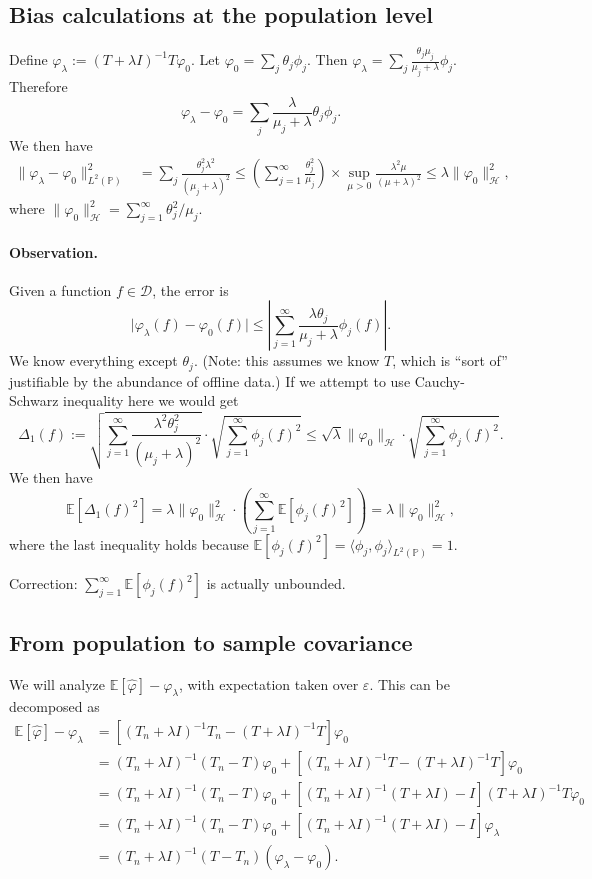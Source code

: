 \documentclass[11pt,a4paper]{article}
\renewcommand{\hat}{\widehat}
\theoremstyle{definition}
\theoremstyle{plain}
\theoremstyle{remark}
\newcommand{\mD}{\mathcal D}
\newcommand{\bP}{\mathbb P}
\newcommand{\lp}{L^2(\bP)}
\newcommand{\mH}{\mathcal H}
\begin{document}
\subsection{Bias calculations at the population level}
Define $\varphi_\lambda := (T+\lambda I)^{-1}T \varphi_0$. Let $\varphi_0 = \sum_j \theta_j \phi_j$. Then $\varphi_\lambda = \sum_j \frac{\theta_j\mu_j}{\mu_j+\lambda}\phi_j$. Therefore
$$
\varphi_\lambda-\varphi_0 = \sum_j \frac{\lambda}{\mu_j+\lambda} \theta_j\phi_j.
$$
We then have
\begin{align*}
\|\varphi_\lambda-\varphi_0\|_{\lp}^2 &= \sum_{j} \frac{\theta_j^2 \lambda^2}{(\mu_j+\lambda)^2} \leq \left(\sum_{j=1}^{\infty}\frac{\theta_j^2}{\mu_j}\right)\times \sup_{\mu>0}\frac{\lambda^2 \mu}{(\mu+\lambda)^2}
\leq \lambda \|\varphi_0\|_{\mH}^2,
\end{align*}
where $\|\varphi_0\|_{\mH}^2 = \sum_{j=1}^{\infty} \theta_j^2/\mu_j$.

{\color{blue}
\paragraph{Observation.} Given a function $f\in\mD$, the error is 
$$
\big|\varphi_\lambda(f)-\varphi_0(f)\big| \leq \left|\sum_{j=1}^{\infty} \frac{\lambda\theta_j}{\mu_j+\lambda}\phi_j(f)\right|.
$$
We know everything except $\theta_j$. (Note: this assumes we know $T$, which is ``sort of'' justifiable by the abundance of offline data.) If we attempt to use Cauchy-Schwarz inequality here we would get
$$
\Delta_1(f) := \sqrt{\sum_{j=1}^{\infty}\frac{\lambda^2\theta_j^2}{(\mu_j+\lambda)^2}}\cdot \sqrt{\sum_{j=1}^{\infty}\phi_j(f)^2} \leq \sqrt{\lambda}\|\varphi_0\|_{\mH}\cdot \sqrt{\sum_{j=1}^{\infty}\phi_j(f)^2}.
$$
We then have
$$
\mathbb E[\Delta_1(f)^2] = \lambda\|\varphi_0\|_{\mH}^2\cdot \left(\sum_{j=1}^{\infty}\mathbb E[\phi_j(f)^2]\right) = \lambda \|\varphi_0\|_{\mH}^2,
$$
where the last inequality holds because $\mathbb E[\phi_j(f)^2] = \langle\phi_j,\phi_j\rangle_{\lp} = 1$.
}

{\color{red} Correction: $\sum_{j=1}^{\infty}\mathbb E[\phi_j(f)^2]$ is actually unbounded.}

\subsection{From population to sample covariance}

We will analyze $\mathbb E[\hat\varphi]-\varphi_\lambda$, with expectation taken over $\varepsilon$. This can be decomposed as
\begin{align*}
\mathbb E[\hat\varphi]-\varphi_\lambda &= [(T_n+\lambda I)^{-1}T_n - (T+\lambda I)^{-1} T]\varphi_0 \\
&= (T_n+\lambda I)^{-1}(T_n-T)\varphi_0 + [(T_n+\lambda I)^{-1}T - (T+\lambda I)^{-1} T]\varphi_0\\
&= (T_n+\lambda I)^{-1}(T_n-T)\varphi_0 + [(T_n+\lambda I)^{-1}(T+\lambda I) - I] (T+\lambda I)^{-1} T\varphi_0\\
&= (T_n+\lambda I)^{-1}(T_n-T)\varphi_0 + [(T_n+\lambda I)^{-1}(T+\lambda I) - I]  \varphi_\lambda\\
&= (T_n+\lambda I)^{-1}(T-T_n)(\varphi_\lambda-\varphi_0).
\end{align*}
\end{document}
